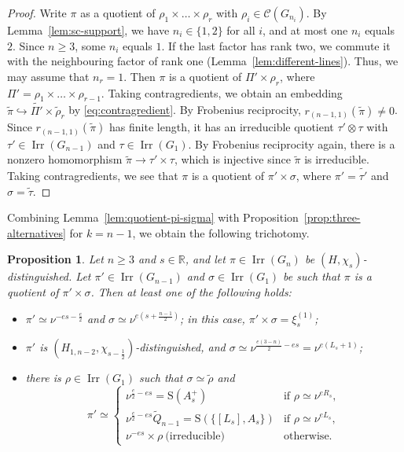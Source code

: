 \documentclass[11pt]{amsart}
\numberwithin{equation}{section}
\theoremstyle{plain}
\newtheorem{proposition}[theorem]{Proposition}
\theoremstyle{definition}
\theoremstyle{remark}
\newcommand{\R}{\mathbb{R}}
\DeclareMathOperator{\Irr}{Irr}
\newcommand{\Qt}{\widetilde{Q}}
\newcommand{\xione}{\xi^{(1)}}
\newcommand{\Ss}{\mathrm{S}}
\begin{document}
\begin{proof}
	Write $\pi$ as a quotient of $\rho_1\times\dots\times\rho_r$ with $\rho_i\in\mathcal C(G_{n_i})$. By Lemma~\ref{lem:sc-support}, we have $n_i\in\{1,2\}$ for all $i$, and at most one $n_i$ equals $2$. Since $n\ge3$, some $n_i$ equals $1$. If the last factor has rank two, we commute it with the neighbouring factor of rank one (Lemma~\ref{lem:different-lines}). Thus, we may assume that $n_r=1$. Then $\pi$ is a quotient of $\Pi'\times\rho_r$, where $\Pi'=\rho_1\times\dots\times\rho_{r-1}$. Taking contragredients, we obtain an embedding $\widetilde\pi\hookrightarrow\widetilde{\Pi'}\times\widetilde\rho_r$ by \eqref{eq:contragredient}. By Frobenius reciprocity, $r_{(n-1,1)}(\widetilde\pi)\ne0$. Since $r_{(n-1,1)}(\widetilde\pi)$ has finite length, it has an irreducible quotient $\tau'\otimes\tau$ with $\tau'\in\Irr(G_{n-1})$ and $\tau\in\Irr(G_1)$. By Frobenius reciprocity again, there is a nonzero homomorphism $\widetilde\pi\to\tau'\times\tau$, which is injective since $\widetilde\pi$ is irreducible. Taking contragredients, we see that $\pi$ is a quotient of $\pi'\times\sigma$, where $\pi'=\widetilde{\tau'}$ and $\sigma=\widetilde\tau$.
\end{proof}

Combining Lemma~\ref{lem:quotient-pi-sigma} with Proposition~\ref{prop:three-alternatives} for $k=n-1$, we obtain the following trichotomy.

\begin{proposition}\label{prop:three-cases}
	Let $n\ge3$ and $s\in\R$, and let $\pi\in\Irr(G_n)$ be $(H,\chi_s)$-distinguished. Let $\pi'\in\Irr(G_{n-1})$ and $\sigma\in\Irr(G_1)$ be such that $\pi$ is a quotient of $\pi'\times\sigma$. Then at least one of the following holds:
	\begin{itemize}
		\item[(I)] $\pi'\simeq\nu^{-es-\frac e2}$ and $\sigma\simeq\nu^{e(s+\frac{n-1}2)}$; in this case, $\pi'\times\sigma=\xione_s$;
		\item[(II)] $\pi'$ is $(H_{1,n-2},\chi_{s-\frac12})$-distinguished, and $\sigma\simeq\nu^{\frac{e(3-n)}2-es}=\nu^{e(L_s+1)}$;
		\item[(III)] there is $\rho\in\Irr(G_1)$ such that $\sigma\simeq\widetilde\rho$ and
		$$
		\pi'\simeq\begin{cases}\nu^{\frac e2-es}=\Ss(A_s^+)&\text{if }\rho\simeq\nu^{eR_s},\\ \nu^{\frac e2-es}\Qt_{n-1}=\Ss(\{[L_s],A_s\})&\text{if }\rho\simeq\nu^{eL_s},\\ \nu^{-es}\times\rho\ \text{(irreducible)}&\text{otherwise}.\end{cases}$$
	\end{itemize}
\end{proposition}
\end{document}
